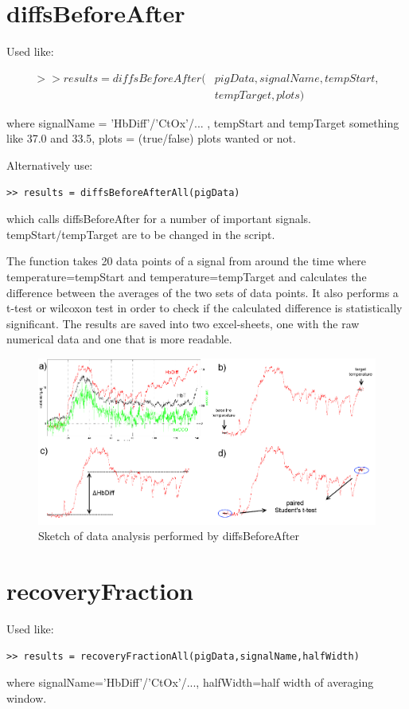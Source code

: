 \documentclass[10pt, a4paper]{article}
\begin{document}
\section{diffsBeforeAfter}
Used like:

\begin{align*}
>> results = diffsBeforeAfter(&pigData,signalName,tempStart,\\&tempTarget,plots)
\end{align*}

where signalName = 'HbDiff'/'CtOx'/... , tempStart and tempTarget something like 37.0 and 33.5, plots = (true/false) plots wanted or not.

Alternatively use:

\begin{lstlisting}
>> results = diffsBeforeAfterAll(pigData)
\end{lstlisting}

which calls diffsBeforeAfter for a number of important signals. tempStart/tempTarget are to be changed in the script.

The function takes 20 data points of a signal from around the time where temperature=tempStart and temperature=tempTarget and calculates the difference between the averages of the two sets of data points. It also performs a t-test or wilcoxon test in order to check if the calculated difference is statistically significant.
The results are saved into two excel-sheets, one with the raw numerical data and one that is more readable.

\begin{figure}[h]
\includegraphics[width=\textwidth]{diffsBeforeAfter}
\caption{Sketch of data analysis performed by diffsBeforeAfter}
\end{figure}


\section{recoveryFraction}
Used like:
\begin{lstlisting}
>> results = recoveryFractionAll(pigData,signalName,halfWidth)
\end{lstlisting}
where signalName='HbDiff'/'CtOx'/..., halfWidth=half width of averaging window.
\end{document}
